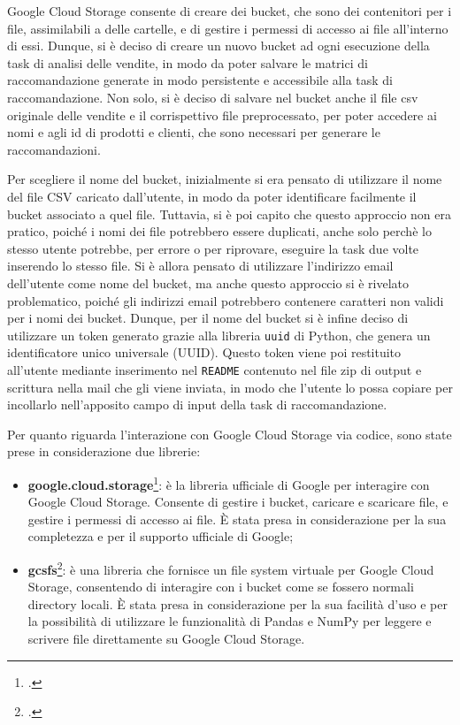 Google Cloud Storage consente di creare dei bucket, che sono dei contenitori per i file, assimilabili a delle cartelle, e di gestire i permessi di accesso ai file all'interno di essi. Dunque, si è deciso di creare un nuovo bucket ad ogni esecuzione della task di analisi delle vendite, in modo da poter salvare le matrici di raccomandazione generate in modo persistente e accessibile alla task di raccomandazione. Non solo, si è deciso di salvare nel bucket anche il file csv originale delle vendite e il corrispettivo file preprocessato, per poter accedere ai nomi e agli id di prodotti e clienti, che sono necessari per generare le raccomandazioni.

Per scegliere il nome del bucket, inizialmente si era pensato di utilizzare il nome del file CSV caricato dall'utente, in modo da poter identificare facilmente il bucket associato a quel file. Tuttavia, si è poi capito che questo approccio non era pratico, poiché i nomi dei file potrebbero essere duplicati, anche solo perchè lo stesso utente potrebbe, per errore o per riprovare, eseguire la task due volte inserendo lo stesso file. Si è allora pensato di utilizzare l'indirizzo email dell'utente come nome del bucket, ma anche questo approccio si è rivelato problematico, poiché gli indirizzi email potrebbero contenere caratteri non validi per i nomi dei bucket.
Dunque, per il nome del bucket si è infine deciso di utilizzare un token generato grazie alla libreria \texttt{uuid} di Python, che genera un identificatore unico universale (UUID). Questo token viene poi restituito all'utente mediante inserimento nel \texttt{README} contenuto nel file zip di output e scrittura nella mail che gli viene inviata, in modo che l'utente lo possa copiare per incollarlo nell'apposito campo di input della task di raccomandazione.

Per quanto riguarda l'interazione con Google Cloud Storage via codice, sono state prese in considerazione due librerie:
\begin{itemize}
    \item \textbf{\gls{google.cloud.storage}}\footcite{site:google-cloud-storage-lib}: è la libreria ufficiale di Google per interagire con Google Cloud Storage. Consente di gestire i bucket, caricare e scaricare file, e gestire i permessi di accesso ai file. È stata presa in considerazione per la sua completezza e per il supporto ufficiale di Google;
    \item \textbf{\gls{gcsfs}}\footcite{site:gcsfs}: è una libreria che fornisce un file system virtuale per Google Cloud Storage, consentendo di interagire con i bucket come se fossero normali directory locali. È stata presa in considerazione per la sua facilità d'uso e per la possibilità di utilizzare le funzionalità di Pandas e NumPy per leggere e scrivere file direttamente su Google Cloud Storage.
\end{itemize}

